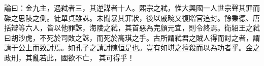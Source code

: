 \begin{pinyinscope}
 論曰：金九主，遇弒者三，其逆謀者十人。熙宗之弒，惟大興國一人世宗聲其罪而磔之思陵之側。徒單貞雖誅。未聞暴其罪狀，後以戚畹又復贈官追封。餘秉德、唐括辯等六人，皆以他罪誅，海陵之弒，其首惡為完顏元宜，則令終焉。衛紹王之弒曰胡沙虎，不死於司敗之誅，而死於高琪之手。古所謂弒君之賊人得而討之者，謂請于公上而致討焉。如孔子之請討陳恒是也。豈有如琪之擅殺而以為功者乎。金之政刑，其亂若此，國欲不亡，
 其可得乎！



\end{pinyinscope}